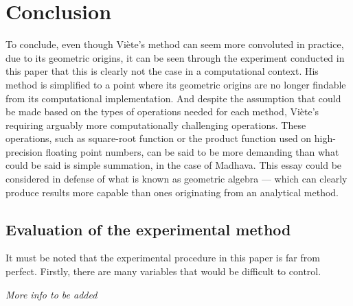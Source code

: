 \section{Conclusion}

To conclude, even though Viète's method can seem more convoluted in practice, due to its geometric origins, 
it can be seen through the experiment conducted in this paper that this is clearly not the case 
in a computational context. His method is simplified to a point where its geometric origins are no 
longer findable from its computational implementation. And despite the assumption that could be 
made based on the types of operations needed for each method, Viète's requiring arguably more 
computationally challenging operations. These operations, such as square-root function or the product function 
used on high-precision floating point numbers, can be said to be more demanding than what could be said 
is simple summation, in the case of Madhava. This essay could be considered in defense of 
what is known as geometric algebra --- which can clearly produce results more capable than ones 
originating from an analytical method. 

\subsection{Evaluation of the experimental method}

It must be noted that the experimental procedure in this paper is far from perfect. Firstly, 
there are many variables that would be difficult to control. 

\textit{More info to be added}